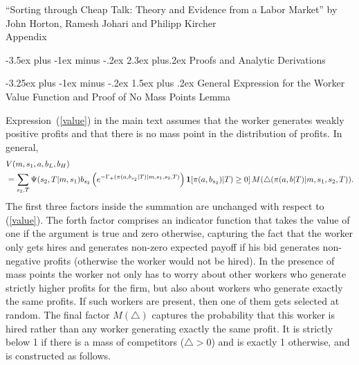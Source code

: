 \documentclass[12pt]{article}
\makeatletter
\renewcommand{\thesection}{\Roman{section}}
\renewcommand{\thesubsection}{\Roman{section}.\Alph{subsection}}
\renewcommand{\section}{%
  \@startsection{section}{1}{\z@}%
  {-3.5ex plus -1ex minus -.2ex}%
  {2.3ex plus.2ex}%
  {\normalfont\Large\bfseries}%
}
\renewcommand{\subsection}{%
  \@startsection{subsection}{2}{\z@}%
  {-3.25ex plus -1ex minus -.2ex}%
  {1.5ex plus .2ex}%
  {\normalfont\large\bfseries}%
}
\makeatother
\begin{document}
\newpage
\appendix
\renewcommand{\thesection}{\Alph{section}}
\renewcommand{\thesubsection}{\Alph{section}.\arabic{subsection}}
\setcounter{section}{0} %
\setcounter{page}{1}

\begin{centering}
    \Large{``Sorting through Cheap Talk: Theory and Evidence from a Labor Market'' by John Horton, Ramesh Johari and Philipp Kircher \\ \bigskip 
    \LARGE Appendix
    \\ \bigskip}
\end{centering}




\section{Proofs and Analytic Derivations} \label{online_app:analysis}


\subsection{General Expression for the Worker Value Function and Proof of No Mass Points Lemma}
\label{online_app:value_and_lemma}

Expression~(\ref{value}) in the main text assumes that the worker generates
weakly positive profits and that there is no mass point in the distribution
of profits. In general,
\begin{align}
&V(m,s_{1},a,b_{L},b_{H}) \label{value1} \\   &=\sum_{s_{2},T}\Psi (s_{2},T|m,s_{1})b_{s_{2}}\left( e^{-\Gamma
_{+}(\pi (a,b_{s_2}|T)|m,s_{1},s_{2},T)} \right) \mathbf{1}[\pi (a,b_{s_2})|T)\geq 0] \, M(\bigtriangleup (\pi
(a,b|T)|m,s_{1},s_{2},T)). \notag 
\end{align}
The first three factors inside the summation are unchanged with respect to (\ref{value}). The forth factor comprises an indicator function that takes the value of one if the argument is true and zero otherwise, capturing the fact that the worker only gets hires and generates non-zero expected payoff if his bid generates non-negative profits (otherwise the worker would not be hired). In the presence of mass points the worker not only has to worry about other workers who generate strictly higher profits for the firm, but also about workers who generate exactly the same profits. If such workers are present, then one of them gets selected at random. The final factor $M(\bigtriangleup )$ captures the probability that this worker is hired rather than any worker generating exactly the same profit. It is
strictly below 1 if there is a mass of competitors ($\bigtriangleup >0$) and is exactly 1 otherwise, and is constructed as follows.
\end{document}
